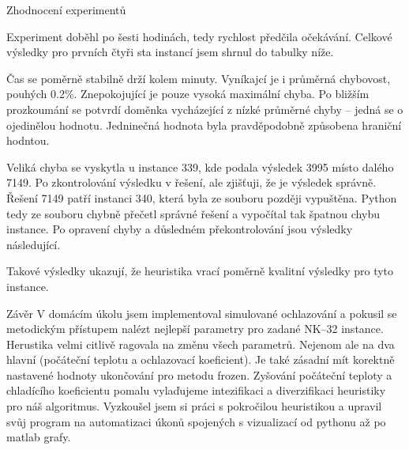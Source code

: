 

\sec Zhodnocení experimentů

Experiment doběhl po šesti hodinách, tedy rychlost předčila očekávání. Celkové výsledky pro prvních čtyři sta instancí jsem shrnul do tabulky níže. 

\bigskip
\centerline{}\bigskip

Čas se poměrně stabilně drží kolem minuty. Vyníkajcí je i průměrná chybovost, pouhých 0.2\%. Znepokojující je pouze vysoká maximální chyba. Po bližším prozkoumání se potvrdí doměnka vycházející z nízké průměrné chyby -- jedná se o ojedinělou hodnotu. Jedninečná hodnota byla pravděpodobně způsobena hraniční hodntou.

Veliká chyba se vyskytla u instance 339, kde podala výsledek 3995 místo dalého 7149. Po zkontrolování výsledku v řešení, ale zjišťuji, že je výsledek správně. Řešení 7149 patří instanci 340, která byla ze souboru později vypuštěna. Python tedy ze souboru chybně přečetl správné řešení a vypočítal tak špatnou chybu instance. Po opravení chyby a důsledném překontrolování jsou výsledky následující.

\bigskip
\centerline{}\bigskip

Takové výsledky ukazují, že heuristika vrací poměrně kvalitní výsledky pro tyto instance.


\sec Závěr
V domácím úkolu jsem implementoval simulované ochlazování a pokusil se metodickým přístupem nalézt nejlepší parametry pro zadané NK--32 instance. Herustika velmi citlivě ragovala na změnu všech parametrů. Nejenom ale na dva hlavní (počáteční teplotu a ochlazovací koeficient). Je také zásadní mít korektně nastavené hodnoty ukončování pro metodu frozen. Zyšování počáteční teploty a chladícího koeficientu pomalu vylaďujeme intezifikaci a diverzifikaci heuristiky pro náš algoritmus. Vyzkoušel jsem si práci s pokročilou heuristikou a upravil svůj program na automatizaci úkonů spojených s vizualizací od pythonu až po matlab grafy. 




\bye
